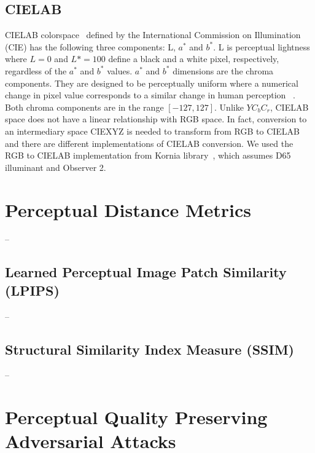 \subsection{CIELAB}
CIELAB colorspace~\cite{schanda2007colorimetry} defined by the International Commission on Illumination (CIE) has the following three components: L, \(a^*\) and \(b^*\). L is perceptual lightness where \(L = 0\) and \(L* = 100\) define a black and a white pixel, respectively, regardless of the \(a^*\) and \(b^*\) values. \(a^*\) and \(b^*\) dimensions are the chroma components. They are designed to be perceptually uniform where a numerical change in pixel value corresponds to a similar change in human perception ~\cite{mahy1992luminancevschroma}. Both chroma components are in the range \([-127, 127]\). Unlike \(YC_{b}C_{r}\), CIELAB space does not have a linear relationship with RGB space. In fact, conversion to an intermediary space CIEXYZ is needed to transform from RGB to CIELAB and there are different implementations of CIELAB conversion. We used the RGB to CIELAB implementation from Kornia library~\cite{riba2020kornia}, which assumes D65 illuminant and Observer 2.

\section{Perceptual Distance Metrics}
--
\subsection{Learned Perceptual Image Patch Similarity (LPIPS)}
--
\subsection{Structural Similarity Index Measure (SSIM)}
--
\section{Perceptual Quality Preserving Adversarial Attacks}

